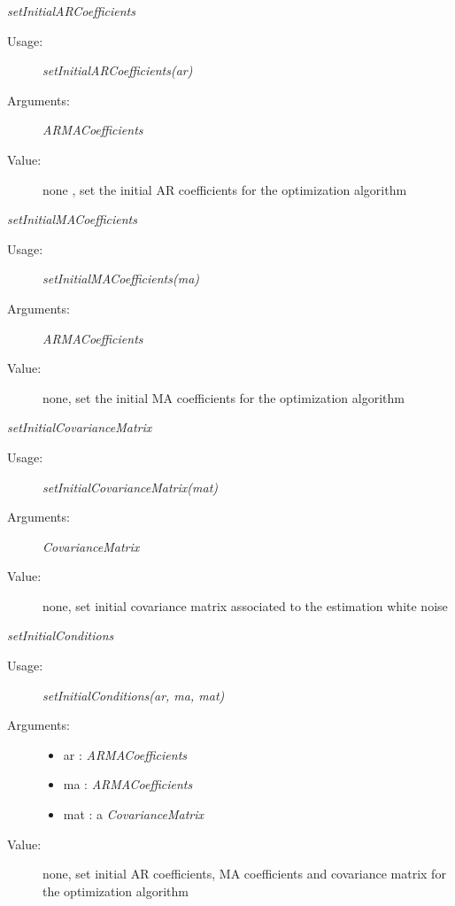 \begin{description}
\begin{description}
\item \textit{setInitialARCoefficients}
\begin{description}
\item[Usage:] \textit{setInitialARCoefficients(ar)}
\item[Arguments:] \textit{ARMACoefficients}
\item[Value:]  none , set the initial AR coefficients for the optimization algorithm
\end{description}

\item \textit{setInitialMACoefficients}
\begin{description}
\item[Usage:] \textit{setInitialMACoefficients(ma)}
\item[Arguments:] \textit{ARMACoefficients}
\item[Value:]  none, set the initial MA coefficients for the optimization algorithm
\end{description}

\item \textit{setInitialCovarianceMatrix}
\begin{description}
\item[Usage:] \textit{setInitialCovarianceMatrix(mat)}
\item[Arguments:]  \textit{CovarianceMatrix}
\item[Value:]  none, set initial covariance matrix associated to the estimation white noise
\end{description}

\item \textit{setInitialConditions}
\begin{description}
\item[Usage:] \textit{setInitialConditions(ar, ma, mat)}
\item[Arguments:]
\begin{itemize}
\item ar : \textit{ARMACoefficients}
\item ma :  \textit{ARMACoefficients}
\item mat : a \textit{CovarianceMatrix}
\end{itemize}
\item[Value:]  none, set initial AR coefficients, MA coefficients and covariance matrix for the optimization algorithm
\end{description}

\end{description}

\end{description}

